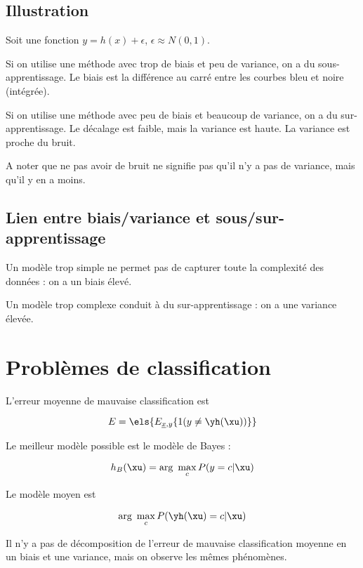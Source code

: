 		\subsection{Illustration}
		
		Soit une fonction $y = h(x) + \epsilon$, $\epsilon \approx N(0, 1)$.
		
		
		Si on utilise une méthode avec trop de biais et peu de variance, on a du sous-apprentissage. Le biais est la différence au carré entre les courbes bleu et noire (intégrée).
		
		
		Si on utilise une méthode avec peu de biais et beaucoup de variance, on a du sur-apprentissage. Le décalage est faible, mais la variance est haute. La variance est proche du bruit.
		
		
		A noter que ne pas avoir de bruit ne signifie pas qu'il n'y a pas de variance, mais qu'il y en a moins.
		

		\subsection{Lien entre biais/variance et sous/sur-apprentissage}
	
		Un modèle trop simple ne permet pas de capturer toute la complexité des données : on a un biais élevé.
	
		Un modèle trop complexe conduit à du sur-apprentissage : on a une variance élevée.
	
	
	\section{Problèmes de classification}
	
	L'erreur moyenne de mauvaise classification est
	
	$$E = \els{E_{\underline{x}, y}\{1 (y \neq \yh(\xu))\}}$$
	
	Le meilleur modèle possible est le modèle de Bayes :
	
	$$h_B(\xu) = \text{arg } \max_c P(y = c \vert \xu)$$
	
	Le modèle moyen est
	
	$$\text{arg } \max_c P(\yh(\xu) = c \vert \xu)$$
	
	Il n'y a pas de décomposition de l'erreur de mauvaise classification moyenne en un biais et une variance, mais on observe les mêmes phénomènes.
	

